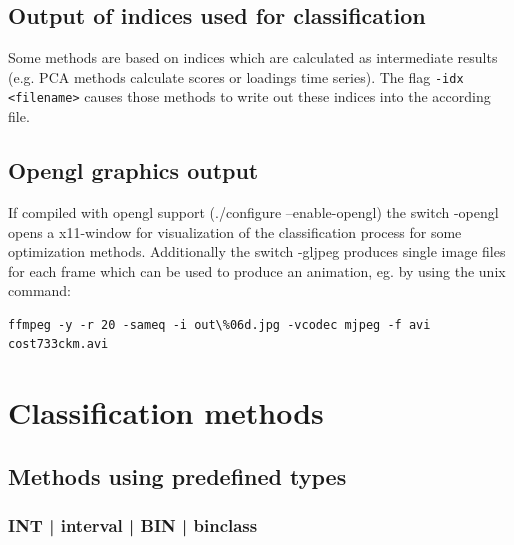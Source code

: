 \documentclass[12pt, oneside, a4paper, headsepline, plainheadsepline]{scrbook}
\begin{document}
\section{Output of indices used for classification}
Some methods are based on indices which are calculated as intermediate results (e.g. PCA methods calculate scores or loadings time series).
The flag \verb+-idx <filename>+ causes those methods to write out these indices into the according file.
\section{Opengl graphics output}
If compiled with opengl support (./configure --enable-opengl) the switch -opengl opens a x11-window
for visualization of the classification process for some optimization methods. Additionally
the switch -gljpeg produces single image files for each frame which can be used to produce an animation, 
eg. by using the unix command:
\begin{lstlisting}
ffmpeg -y -r 20 -sameq -i out\%06d.jpg -vcodec mjpeg -f avi cost733ckm.avi
\end{lstlisting}

\chapter{Classification methods}


\section{Methods using predefined types}

\subsection{INT | interval | BIN | binclass}
\end{document}
